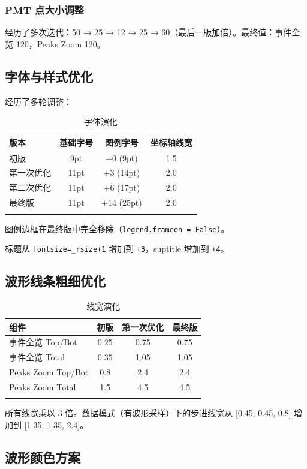 \documentclass[12pt,a4paper]{article}
\begin{document}
\subsubsection{PMT 点大小调整}

经历了多次迭代：50 → 25 → 12 → 25 → 60（最后一版加倍）。最终值：事件全览 120，Peaks Zoom 120。

\subsection{字体与样式优化}

经历了多轮调整：

\begin{longtable}{|l|c|c|c|}
\hline
\textbf{版本} & \textbf{基础字号} & \textbf{图例字号} & \textbf{坐标轴线宽} \\
\hline
初版 & 9pt & +0 (9pt) & 1.5 \\
第一次优化 & 11pt & +3 (14pt) & 2.0 \\
第二次优化 & 11pt & +6 (17pt) & 2.0 \\
最终版 & 11pt & +14 (25pt) & 2.0 \\
\hline
\caption{字体演化}
\end{longtable}

图例边框在最终版中完全移除（\texttt{legend.frameon = False}）。

标题从 \texttt{fontsize=\_rsize+1} 增加到 \texttt{+3}，suptitle 增加到 \texttt{+4}。

\subsection{波形线条粗细优化}

\begin{longtable}{|l|c|c|c|}
\hline
\textbf{组件} & \textbf{初版} & \textbf{第一次优化} & \textbf{最终版} \\
\hline
事件全览 Top/Bot & 0.25 & 0.75 & 0.75 \\
事件全览 Total & 0.35 & 1.05 & 1.05 \\
Peaks Zoom Top/Bot & 0.8 & 2.4 & 2.4 \\
Peaks Zoom Total & 1.5 & 4.5 & 4.5 \\
\hline
\caption{线宽演化}
\end{longtable}

所有线宽乘以 3 倍。数据模式（有波形采样）下的步进线宽从 [0.45, 0.45, 0.8] 增加到 [1.35, 1.35, 2.4]。

\subsection{波形颜色方案}
\end{document}
